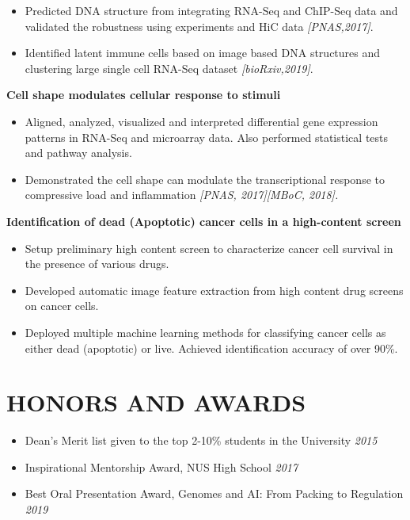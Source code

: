 \documentclass[letterpaper,11pt]{article}
\begin{document}
\begin{itemize}
    \item Predicted DNA structure from integrating RNA-Seq and ChIP-Seq data and validated    the robustness using experiments and HiC data \emph{[PNAS,2017]}.
    \item Identified latent immune cells based on image based DNA structures and clustering large single cell RNA-Seq dataset \emph{[bioRxiv,2019]}.
\end{itemize}
\vspace{1mm}
{\bf Cell shape modulates cellular response to stimuli}
\begin{itemize}
    \item Aligned, analyzed, visualized and interpreted differential gene expression patterns in RNA-Seq and microarray data. Also performed statistical tests and pathway analysis. 
    \item Demonstrated the cell shape can modulate the transcriptional response to compressive load and inflammation \em{[PNAS, 2017][MBoC, 2018]}.
\end{itemize}
\vspace{1mm}
{\bf Identification of dead (Apoptotic) cancer cells in a high-content screen}
\begin{itemize}
\item Setup preliminary high content screen to characterize cancer cell survival in the presence of various drugs.
\item Developed automatic image feature extraction from high content drug screens on cancer cells.
\item Deployed multiple machine learning methods for classifying cancer cells as either dead (apoptotic) or live.
Achieved identification accuracy of over 90\%.
\end{itemize}

\vspace{1mm}
\section{\bf HONORS AND AWARDS}
\begin{itemize}
    \item Dean’s Merit list given to the top 2-10\% students in the University \hfill \emph {2015}
    \item Inspirational Mentorship Award, NUS High School \hfill \emph {2017} 
    \item Best Oral Presentation Award, Genomes and AI: From Packing to Regulation \hfill \emph{2019} 
\end{itemize}
\end{document}
